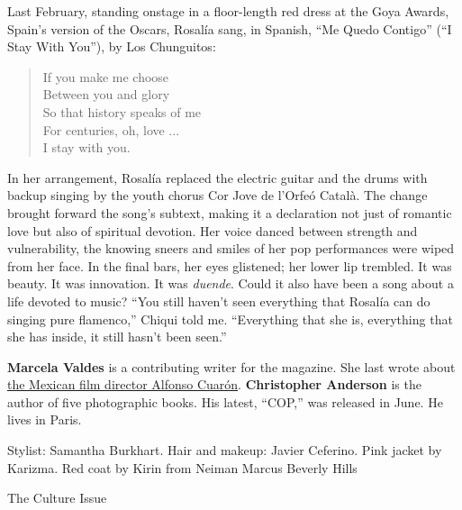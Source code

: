 Last February, standing onstage in a floor-length red dress at the Goya
Awards, Spain's version of the Oscars, Rosalía sang, in Spanish, ``Me
Quedo Contigo'' (``I Stay With You''), by Los Chunguitos:

\begin{quote}
If you make me choose\\
Between you and glory\\
So that history speaks of me\\
For centuries, oh, love ...\\
I stay with you.
\end{quote}

In her arrangement, Rosalía replaced the electric guitar and the drums
with backup singing by the youth chorus Cor Jove de l'Orfeó Català. The
change brought forward the song's subtext, making it a declaration not
just of romantic love but also of spiritual devotion. Her voice danced
between strength and vulnerability, the knowing sneers and smiles of her
pop performances were wiped from her face. In the final bars, her eyes
glistened; her lower lip trembled. It was beauty. It was innovation. It
was \emph{duende}. Could it also have been a song about a life devoted
to music? ``You still haven't seen everything that Rosalía can do
singing pure flamenco,'' Chiqui told me. ``Everything that she is,
everything that she has inside, it still hasn't been seen.''

\textbf{Marcela Valdes} is a contributing writer for the magazine. She
last wrote about
\href{https://www.nytimes3xbfgragh.onion/2018/12/13/magazine/alfonso-cuaron-roma-mexico-netflix.html}{the
Mexican film director Alfonso Cuarón}. \textbf{Christopher Anderson} is
the author of five photographic books. His latest, ``COP,'' was released
in June. He lives in Paris.

Stylist: Samantha Burkhart. Hair and makeup: Javier Ceferino. Pink
jacket by Karizma. Red coat by Kirin from Neiman Marcus Beverly Hills

The Culture Issue

